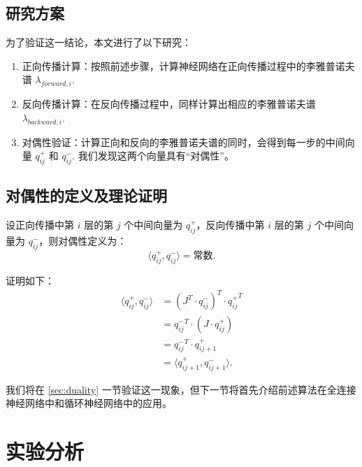 \subsection{研究方案}

为了验证这一结论，本文进行了以下研究：

\begin{enumerate}
  \item 正向传播计算：按照前述步骤，计算神经网络在正向传播过程中的李雅普诺夫谱 \(\lambda_{forward, i}\).
  \item 反向传播计算：在反向传播过程中，同样计算出相应的李雅普诺夫谱 \(\lambda_{backward, i}\).
  \item 对偶性验证：计算正向和反向的李雅普诺夫谱的同时，会得到每一步的中间向量 \(q_{ij}^{+}\) 和 \(q_{ij}^{-}\). 我们发现这两个向量具有“对偶性”。
\end{enumerate}

\subsection{对偶性的定义及理论证明}

设正向传播中第 \(i\) 层的第 \(j\) 个中间向量为 \(q_{ij}^{+}\)，反向传播中第 \(i\) 层的第 \(j\) 个中间向量为 \(q_{ij}^{-}\)，则对偶性定义为：
\begin{equation}\label{eq:duality}
  \langle q_{ij}^{+}, q_{ij}^{-} \rangle = \text{常数}.
\end{equation}

证明如下：
\begin{equation}
  \begin{aligned}
    \langle q_{ij}^{+}, q_{ij}^{-} \rangle & = (J^T \cdot q_{ij}^{-})^T\cdot {q_{ij}^{+}}^T \\
                                            & = {q_{ij}^{-}}^T \cdot (J \cdot q_{ij}^{+})    \\
                                            & = {q_{ij}^{-}}^T \cdot q_{ij+1}^{+}            \\
                                            & = \langle q_{ij+1}^{+}, q_{ij+1}^{-} \rangle.
    \end{aligned}
\end{equation}

我们将在 \ref{sec:duality} 一节验证这一现象，但下一节将首先介绍前述算法在全连接神经网络中和循环神经网络中的应用。

\section{实验分析}

